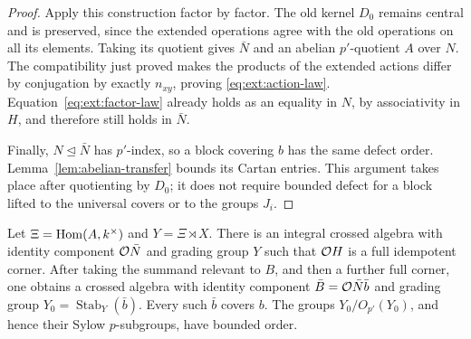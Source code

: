 \begin{proof}
Apply this construction factor by factor.  The old kernel $D_0$
remains central and is preserved, since the extended operations
agree with the old operations on all its elements.  Taking its
quotient gives $\bar N$ and an abelian $p'$-quotient $A$ over $N$.
The compatibility just proved makes the products of the extended
actions differ by conjugation by exactly $n_{xy}$, proving
\eqref{eq:ext:action-law}.  Equation~\eqref{eq:ext:factor-law}
already holds as an equality in $N$, by associativity in $H$, and
therefore still holds in $\bar N$.

Finally, $N\trianglelefteq\bar N$ has $p'$-index, so a block covering
$b$ has the same defect order.  Lemma~\ref{lem:abelian-transfer}
bounds its Cartan entries.  This argument takes place after
quotienting by $D_0$; it does not require bounded defect for a block
lifted to the universal covers or to the groups $J_i$.
\end{proof}

\begin{lemma}\label{lem:ext:dual-recovery}
Let $\Xi=\operatorname{Hom}(A,k^\times)$ and $Y=\Xi\rtimes X$.  There is an
integral crossed algebra with identity component $\mathcal O\bar N$ and
grading group $Y$ such that $\mathcal O H$ is a full idempotent corner.
After taking the summand relevant to $B$, and then a further full
corner, one obtains a crossed algebra with identity component
$\bar B=\mathcal O\bar N\bar b$ and grading group
$Y_0=\operatorname{Stab}_Y(\bar b)$.  Every such $\bar b$ covers $b$.  The groups
$Y_0/O_{p'}(Y_0)$, and hence their Sylow $p$-subgroups, have bounded
order.
\end{lemma}

